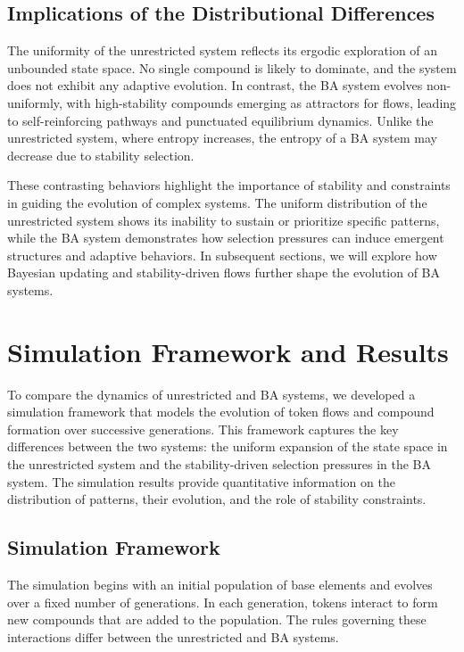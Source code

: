\documentclass[entropy,article,submit,pdftex,oneauthor]{Definitions/mdpi}
\begin{document}
\subsection{Implications of the Distributional Differences}

The uniformity of the unrestricted system reflects its ergodic exploration of an unbounded state space. No single compound is likely to dominate, and the system does not exhibit any adaptive evolution. In contrast, the BA system evolves non-uniformly, with high-stability compounds emerging as attractors for flows, leading to self-reinforcing pathways and punctuated equilibrium \cite{gould1977punctuated} dynamics. Unlike the unrestricted system, where entropy increases, the entropy of a BA system may decrease due to stability selection.

These contrasting behaviors highlight the importance of stability and constraints in guiding the evolution of complex systems. The uniform distribution of the unrestricted system shows its inability to sustain or prioritize specific patterns, while the BA system demonstrates how selection pressures can induce emergent structures and adaptive behaviors. In subsequent sections, we will explore how Bayesian updating and stability-driven flows further shape the evolution of BA systems.

\section{Simulation Framework and Results}

To compare the dynamics of unrestricted and BA systems, we developed a simulation framework that models the evolution of token flows and compound formation over successive generations. This framework captures the key differences between the two systems: the uniform expansion of the state space in the unrestricted system and the stability-driven selection pressures in the BA system. The simulation results provide quantitative information on the distribution of patterns, their evolution, and the role of stability constraints.

\subsection{Simulation Framework}

The simulation begins with an initial population of base elements and evolves over a fixed number of generations. In each generation, tokens interact to form new compounds that are added to the population. The rules governing these interactions differ between the unrestricted and BA systems.
\end{document}
